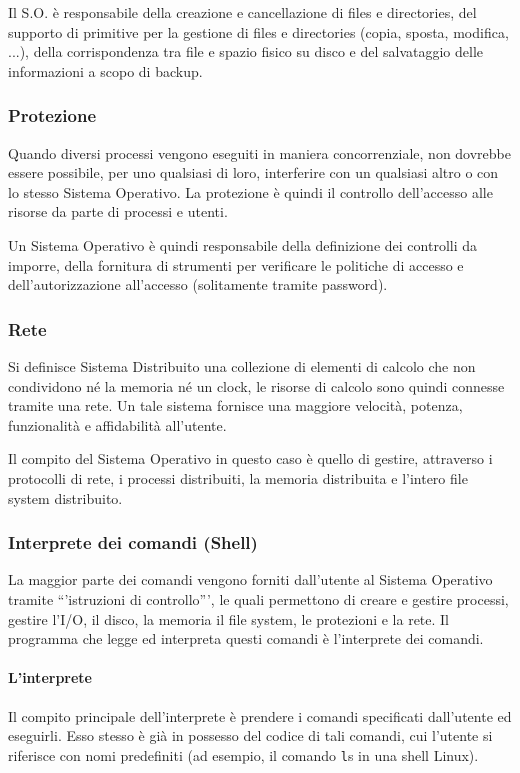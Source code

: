\documentclass[a4]{article}
\begin{document}
Il S.O. è responsabile della creazione e cancellazione di files e directories, del supporto di primitive per la gestione di files e directories (copia, sposta, modifica, ...), della corrispondenza tra file e spazio fisico su disco e del salvataggio delle informazioni a scopo di backup.

\subsubsection{Protezione}
Quando diversi processi vengono eseguiti in maniera concorrenziale, non dovrebbe essere possibile, per uno qualsiasi di loro, interferire con un qualsiasi altro o con lo stesso Sistema Operativo. La protezione è quindi il controllo dell'accesso alle risorse da parte di processi e utenti.

Un Sistema Operativo è quindi responsabile della definizione dei controlli da imporre, della fornitura di strumenti per verificare le politiche di accesso e dell'autorizzazione all'accesso (solitamente tramite password).

\subsubsection{Rete}
Si definisce Sistema Distribuito una collezione di elementi di calcolo che non condividono né la memoria né un clock, le risorse di calcolo sono quindi connesse tramite una rete. Un tale sistema fornisce una maggiore velocità, potenza, funzionalità e affidabilità all'utente.

Il compito del Sistema Operativo in questo caso è quello di gestire, attraverso i protocolli di rete, i processi distribuiti, la memoria distribuita e l'intero file system distribuito.

\subsubsection{Interprete dei comandi (Shell)}
La maggior parte dei comandi vengono forniti dall'utente al Sistema Operativo tramite ``'istruzioni di controllo''', le quali permettono di creare e gestire processi, gestire l'I/O, il disco, la memoria il file system, le protezioni e la rete. Il programma che legge ed interpreta questi comandi è l'interprete dei comandi.
\paragraph{L'interprete}
Il compito principale dell'interprete è prendere i comandi specificati dall'utente ed eseguirli. Esso stesso è già in possesso del codice di tali comandi, cui l'utente si riferisce con nomi predefiniti (ad esempio, il comando \texttt ls in una shell Linux).
\end{document}
